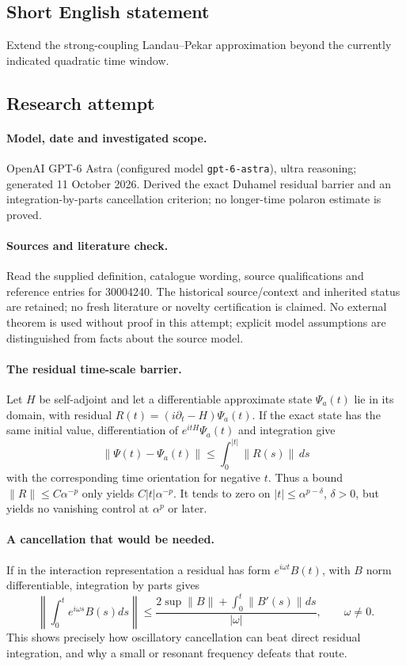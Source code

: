 \documentclass[11pt]{article}
\begin{document}
\subsection{Short English statement}
Extend the strong-coupling Landau--Pekar approximation beyond the currently indicated quadratic time window.
\subsection{Research attempt}
\paragraph{Model, date and investigated scope.}
OpenAI GPT-6 Astra (configured model \texttt{gpt-6-astra}), ultra reasoning; generated 11 October 2026. Derived the exact Duhamel residual barrier and an integration-by-parts cancellation criterion; no longer-time polaron estimate is proved.

\paragraph{Sources and literature check.}
Read the supplied definition, catalogue wording, source qualifications and reference entries for 30004240. The historical source/context and inherited status are retained; no fresh literature or novelty certification is claimed. No external theorem is used without proof in this attempt; explicit model assumptions are distinguished from facts about the source model.

\paragraph{The residual time-scale barrier.} Let \(H\) be self-adjoint and let a differentiable approximate state \(\Psi_a(t)\) lie in its domain, with residual \(R(t)=(i\partial_t-H)\Psi_a(t)\). If the exact state has the same initial value, differentiation of \(e^{itH}\Psi_a(t)\) and integration give
\[
 \|\Psi(t)-\Psi_a(t)\|\le\int_0^{|t|}\|R(s)\|\,ds
\]
with the corresponding time orientation for negative \(t\). Thus a bound \(\|R\|\le C\alpha^{-p}\) only yields \(C|t|\alpha^{-p}\). It tends to zero on \(|t|\le\alpha^{p-\delta}\), \(\delta>0\), but yields no vanishing control at \(\alpha^p\) or later.
\paragraph{A cancellation that would be needed.} If in the interaction representation a residual has form \(e^{i\omega t}B(t)\), with \(B\) norm differentiable, integration by parts gives
\[
 \left\|\int_0^t e^{i\omega s}B(s)ds\right\|
 \le\frac{2\sup\|B\|+\int_0^t\|B'(s)\|ds}{|\omega|},\qquad\omega\ne0.
\]
This shows precisely how oscillatory cancellation can beat direct residual integration, and why a small or resonant frequency defeats that route.
\end{document}
